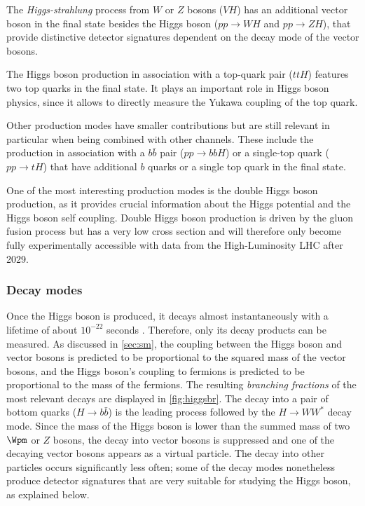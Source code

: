 The \emph{Higgs-strahlung} process from $W$ or $Z$ bosons ($VH$) has an additional vector boson in the final state besides the Higgs boson ($pp \rightarrow WH$ and $pp \rightarrow ZH$), that provide distinctive detector signatures dependent on the decay mode of the vector bosons. 

The Higgs boson production in association with a top-quark pair ($ttH$) features two top quarks in the final state. It plays an important role in Higgs boson physics, since it allows to directly measure the Yukawa coupling of the top quark. 

Other production modes have smaller contributions but are still relevant in particular when being combined with other channels.
These include the production in association with a $b\bar{b}$ pair ($pp\rightarrow bbH$) or a single-top quark ($pp \rightarrow tH$) that have additional $b$ quarks or a single top quark in the final state. 

One of the most interesting production modes is the double Higgs boson production, as it provides crucial information about the Higgs potential and the Higgs boson self coupling. Double Higgs boson production is driven by the gluon fusion process but has a very low cross section and will therefore only become fully experimentally accessible with data from the High-Luminosity LHC after 2029. 

\subsubsection{Decay modes}
Once the Higgs boson is produced, it decays almost instantaneously with a lifetime of about $10^{-22}$ seconds \cite{PDG2020}.
Therefore, only its decay products can be measured.
As discussed in \cref{sec:sm}, the coupling between the Higgs boson and vector bosons is predicted to be proportional to the squared mass of the vector bosons, and the Higgs boson's coupling to fermions is predicted to be proportional to the mass of the fermions. The resulting \emph{branching fractions} of the most relevant decays are displayed in \cref{fig:higgsbr}. 
The decay into a pair of bottom quarks ($H\rightarrow b\bar{b}$) is the leading process followed by the $H\rightarrow WW^*$ decay mode. Since the mass of the Higgs boson is lower than the summed mass of two $\Wpm$ or $Z$ bosons, the decay into vector bosons is suppressed and one of the decaying vector bosons appears as a virtual particle. The decay into other particles occurs significantly less often; some of the decay modes nonetheless produce detector signatures that are very suitable for studying the Higgs boson, as explained below.

